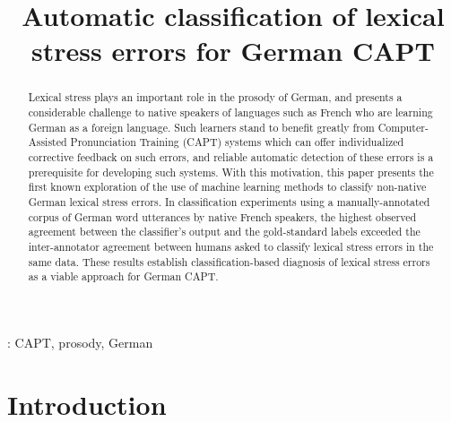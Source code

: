 \documentclass[a4paper]{article}
\title{Automatic classification of lexical stress errors for German CAPT}
\newcommand{\TODO}[1]{{\color{red}\textbf{[TODO #1]}}}
\begin{document}
  \maketitle
  \begin{abstract}
    
  	Lexical stress plays an important role in the prosody of German, and presents a considerable challenge to native speakers of languages such as French who are learning German as a foreign language. Such learners stand to benefit greatly from Computer-Assisted Pronunciation Training (CAPT) systems which can offer individualized corrective feedback on such errors, and reliable automatic detection of these errors is a prerequisite for developing such systems. With this motivation, this paper presents the first known exploration of the use of machine learning methods to classify non-native German lexical stress errors. 
  	In classification experiments using a manually-annotated corpus of German word utterances by native French speakers,
  	the highest observed agreement between the classifier's output and the gold-standard labels 
  	exceeded the inter-annotator agreement between humans asked to classify lexical stress errors in the same data. 
  	These results 
  	establish classification-based diagnosis of lexical stress errors as a viable approach for German CAPT.
    
    
    
  \end{abstract}
  : CAPT, prosody, German %


  \section{Introduction}
  
  
\end{document}
